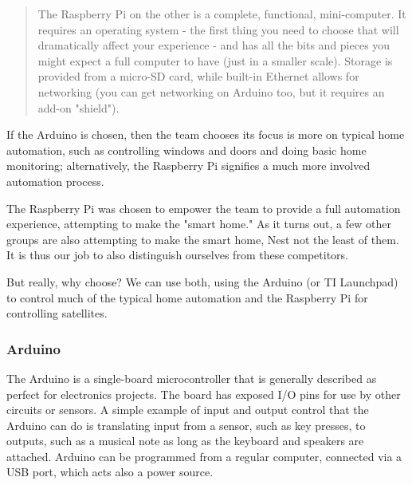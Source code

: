 \begin{multicols}{2}
\begin{quote}
			The Raspberry Pi on the other is a complete, functional, mini-computer. It requires an operating system - the first thing you need to choose that will dramatically affect your experience - and has all the bits and pieces you might expect a full computer to have (just in a smaller scale). Storage is provided from a micro-SD card, while built-in Ethernet allows for networking (you can get networking on Arduino too, but it requires an add-on "shield").
		\end{quote}
		
		If the Arduino is chosen, then the team chooses its focus is more on typical home automation, such as controlling windows and doors and doing basic home monitoring; alternatively, the Raspberry Pi signifies a much more involved automation process.
		
		The Raspberry Pi was chosen to empower the team to provide a full automation experience, attempting to make the "smart home."
		As it turns out, a few other groups are also attempting to make the smart home, Nest not the least of them.
		It is thus our job to also distinguish ourselves from these competitors.
		
		But really, why choose?
		We can use both, using the Arduino (or TI Launchpad) to control much of the typical home automation and the Raspberry Pi for controlling satellites.
	
	\subsubsection{Arduino}
	
		The Arduino is a single-board microcontroller that is generally described as perfect for electronics projects. 
		The board has exposed I/O pins for use by other circuits or sensors.
		A simple example of input and output control that the Arduino can do is translating input from a sensor, such as key presses, to outputs, such as a musical note as long as the keyboard and speakers are attached.
		Arduino can be programmed from a regular computer, connected via a USB port, which acts also a power source.
		

\end{multicols}
